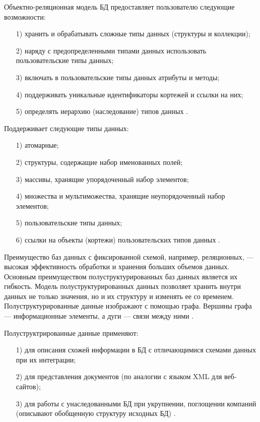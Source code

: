 \documentclass{bmstu}
\begin{document}
Объектно-реляционная модель БД предоставляет пользователю следующие возможности:
\begin{enumerate}
\item[1)] хранить и обрабатывать сложные типы данных (структуры и коллекции);
\item[2)] наряду с предопределенными типами данных использовать пользовательские типы данных;
\item[3)] включать в пользовательские типы данных атрибуты и методы;
\item[4)] поддерживать уникальные идентификаторы кортежей и ссылки на них;
\item[5)] определять иерархию (наследование) типов данных \cite{Vinogradov2016}.
\end{enumerate}

Поддерживает следующие типы данных:
\begin{enumerate}
\item[1)] атомарные;
\item[2)] структуры, содержащие набор именованных полей;
\item[3)] массивы, хранящие упорядоченный набор элементов;
\item[4)] множества и мультиможества, хранящие неупорядоченный набор элементов;
\item[5)] пользовательские типы данных;
\item[6)] ссылки на объекты (кортежи) пользовательских типов данных \cite{Vinogradov2016}.
\end{enumerate}

Преимущество баз данных с фиксированной схемой, например, реляционных, --- высокая эффективность обработки и хранения больших объемов данных. 
Основным преимуществом полуструктурированных баз данных является их гибкость. 
Модель полуструктурированных данных позволяет хранить внутри данных не только значения, но и их структуру и изменять ее со временем. 
Полуструктурированные данные изображают с помощью графа. 
Вершины графа --- информационные элементы, а дуги --- связи между ними \cite{Vinogradov2016}.

Полуструктрированные данные применяют:
\begin{enumerate}
\item[1)] для описания схожей информации в БД с отличающимися схемами данных при их интеграции;
\item[2)] для представления документов (по аналогии с языком XML для веб-сайтов);
\item[3)] для работы с унаследованными БД при укрупнении, поглощении компаний (описывают обобщенную структуру исходных БД) \cite{Vinogradov2016}.
\end{enumerate}
\end{document}
